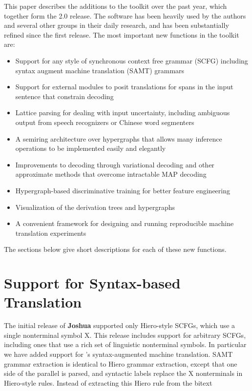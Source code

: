 \documentclass[11pt]{article}
\newcommand{\joshua}{\textbf{Joshua}\xspace}
\begin{document}
This paper describes the additions to the toolkit over the past year, which together form the 2.0 release. The software has been heavily used by the authors and several other groups in their daily research, and has been substantially refined since the first release.  The most important new functions in the toolkit are: 
\begin{itemize}
\item
Support for any style of synchronous context free grammar (SCFG)
including syntax augment machine translation (SAMT) grammars \cite{samt2006}
\item
Support for external modules to posit translations for spans in the input sentence that constrain decoding   \cite{PBML-2010-Joshua-modules}
\item
Lattice parsing for dealing with input uncertainty, including ambiguous output from speech recognizers or Chinese word segmenters  \cite{dyer-muresan-resnik:2008:ACLMain}
\item
A semiring architecture over hypergraphs that allows many inference operations to be implemented easily and elegantly \cite{li-eisner:2009:EMNLP}
\item
Improvements to decoding through variational decoding and other approximate methods that overcome intractable MAP decoding \cite{variational-decoding-acl09}
\item
Hypergraph-based discriminative training for better feature engineering \cite{zhifei-forest-reranking-galebook}
\item
Visualization of the derivation trees and hypergraphs \cite{PBML-2010-Joshua-visualization}
\item
A convenient framework for designing and running reproducible machine translation experiments \cite{Schwartz-wmt10-pipline}
\end{itemize}
The sections below give short descriptions for each of these new functions.


\section{Support for Syntax-based Translation}

The initial release of \joshua supported only Hiero-style SCFGs, which use a single nonterminal symbol X.  This release includes support for arbitrary SCFGs, including ones that use a rich set of linguistic nonterminal symbols.  
In particular we have added support for 's syntax-augmented machine
translation. SAMT grammar extraction is identical to Hiero grammar extraction, except that one side of the parallel is parsed, and syntactic labels replace the X
nonterminals in Hiero-style rules.  Instead of extracting this Hiero rule from the bitext
\end{document}
